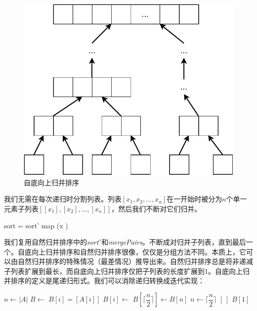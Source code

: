 \documentclass[b5paper]{ctexart}
\begin{document}
\begin{figure}[htbp]
 \centering
 \includegraphics[scale=0.6]{img/bottom-up-msort}
 \caption{自底向上归并排序}
 \label{fig:bottom-up-msort}
\end{figure}

我们无需在每次递归时分割列表。列表$[x_1, x_2, ..., x_n]$在一开始时被分为$n$个单一元素子列表$[[x_1], [x_2], ..., [x_n]]$，然后我们不断对它们归并。

\be
sort = sort' \circ map (x \mapsto [x])
\ee

我们复用自然归并排序中的$sort'$和\textit{mergePairs}。不断成对归并子列表，直到最后一个\cite{okasaki-book}。自底向上归并排序和自然归并排序很像，仅仅是分组方法不同。本质上，它可以由自然归并排序的特殊情况（最差情况）推导出来。自然归并排序总是将非递减子列表扩展到最长，而自底向上归并排序仅把子列表的长度扩展到1。自底向上归并排序的定义是尾递归形式。我们可以消除递归转换成迭代实现：

\begin{algorithmic}[1]
  \State $n \gets |A|$
  \State $B \gets $ 
    \State $B[i] = [A[i]]$
  \EndFor
      \State $B[i] \gets$ 
    \EndFor
      \State $B[\lceil \dfrac{n}{2} \rceil] \gets B[n]$
    \EndIf
    \State $n \gets \lceil \dfrac{n}{2} \rceil$
  \EndWhile
    \State \Return $[\ ]$
  \EndIf
  \State \Return $B[1]$
\EndFunction
\end{algorithmic}
\end{document}
